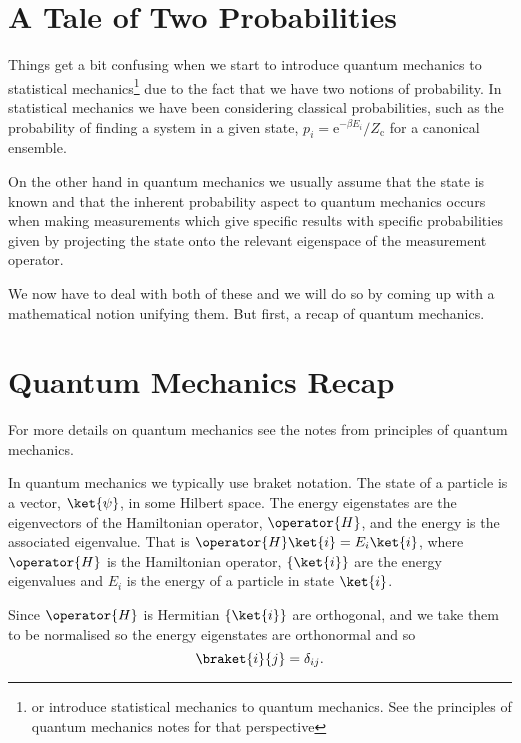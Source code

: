 \documentclass[fleqn]{NotesClass}
\newcommand*{\cpartition}{Z_{\mathrm{c}}}
\newcommand*{\e}{\mathrm{e}}
\begin{document}
    \section{A Tale of Two Probabilities}
    Things get a bit confusing when we start to introduce quantum mechanics to statistical mechanics\footnote{or introduce statistical mechanics to quantum mechanics. See the principles of quantum mechanics notes for that perspective} due to the fact that we have two notions of probability.
    In statistical mechanics we have been considering classical probabilities, such as the probability of finding a system in a given state, \(p_i = \e^{-\beta E_i}/\cpartition\) for a canonical ensemble.
    
    On the other hand in quantum mechanics we usually assume that the state is known and that the inherent probability aspect to quantum mechanics occurs when making measurements which give specific results with specific probabilities given by projecting the state onto the relevant eigenspace of the measurement operator.
    
    We now have to deal with both of these and we will do so by coming up with a mathematical notion unifying them.
    But first, a recap of quantum mechanics.
    
    \section{Quantum Mechanics Recap}
    \begin{rmk}
        For more details on quantum mechanics see the notes from principles of quantum mechanics.
    \end{rmk}
    In quantum mechanics we typically use braket notation.
    The state of a particle is a vector, \(\ket{\psi}\), in some Hilbert space.
    The energy eigenstates are the eigenvectors of the Hamiltonian operator, \(\operator{H}\), and the energy is the associated eigenvalue.
    That is \(\operator{H}\ket{i} = E_i\ket{i}\), where \(\operator{H}\) is the Hamiltonian operator, \(\{\ket{i}\}\) are the energy eigenvalues and \(E_i\) is the energy of a particle in state \(\ket{i}\).
    
    Since \(\operator{H}\) is Hermitian \(\{\ket{i}\}\) are orthogonal, and we take them to be normalised so the energy eigenstates are orthonormal and so
    \begin{equation}
        \braket{i}{j} = \delta_{ij}.
    \end{equation}
    
\end{document}
